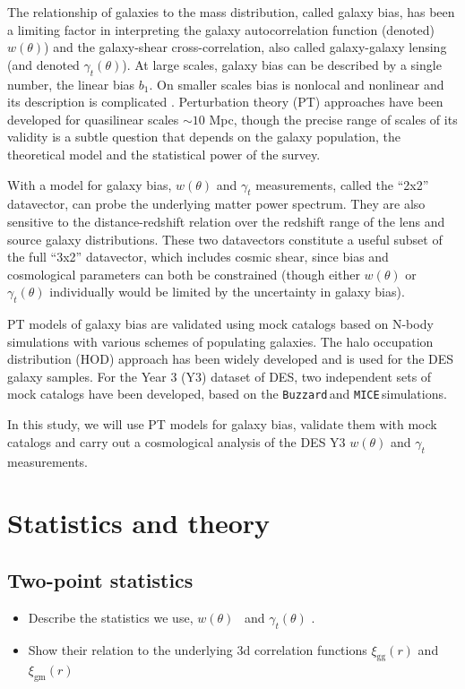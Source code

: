 \documentclass[fleqn,usenatbib]{mnras}
\newcommand{\gammat}{\ensuremath{\gamma_{t}(\theta)} }
\newcommand{\wtheta}{\ensuremath{w(\theta)} }
\newcommand{\xigg}{\ensuremath{\xi_{\mathrm{gg}}}}
\newcommand{\xigm}{\ensuremath{\xi_{\mathrm{gm}}}}
\newcommand{\mice}{\texttt{MICE}\,}
\newcommand{\buzzard}{\texttt{Buzzard}\,}
\begin{document}
The relationship of galaxies to the mass distribution, called galaxy bias, has been a limiting factor in interpreting the galaxy autocorrelation function (denoted) $w(\theta)$) and the galaxy-shear cross-correlation, also called galaxy-galaxy lensing (and denoted $\gamma_t(\theta)$). At large scales, galaxy bias can be described by a single number, the linear bias $b_1$. On smaller scales bias is nonlocal and nonlinear and its description is complicated \citep{Fry_93,Scherrer_98}. Perturbation theory (PT) approaches have been developed for quasilinear scales $\sim 10$ Mpc, though the precise range of scales of its validity is a subtle question that depends on the galaxy population, the theoretical model and the statistical power of the survey. 

With a model for galaxy bias, $w(\theta)$ and $\gamma_t$ measurements, called the ``2x2'' datavector,   can probe the underlying matter power spectrum. They are also sensitive to the distance-redshift relation over the redshift range of the lens and source galaxy distributions.  These two datavectors constitute a useful subset of the full ``3x2'' datavector, which includes cosmic shear, since bias and cosmological parameters can both be constrained (though either $w(\theta)$ or $\gamma_t(\theta)$ individually would be limited by the uncertainty in galaxy bias). 

PT models of galaxy bias are validated using mock catalogs based on N-body simulations with various schemes of populating galaxies. The halo occupation distribution (HOD) approach has been widely developed and is used for the DES galaxy samples. For the Year 3 (Y3) dataset of DES, two independent sets of mock catalogs have been developed, based on the \buzzard and \mice simulations. 

In this study, we will use PT models for galaxy bias, validate them with mock catalogs and carry out a cosmological analysis of the DES Y3 $w(\theta)$ and $\gamma_t$ measurements.




\section{Statistics and theory}
\label{sec:stat_theory}
\subsection{Two-point statistics}
\label{sec:2pt}
\begin{itemize}
    \item Describe the statistics we use, \wtheta\ and \gammat.
    \item Show their relation to the underlying 3d correlation functions $\xigg(r)$ and $\xigm(r)$
\end{itemize}
\end{document}
